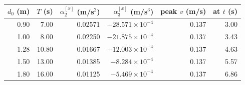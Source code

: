 \begin{tabular}{@{}rrrrrr@{}}
\toprule
$d_0$ (m) & $T$ (s) & $\alpha_2^{[x]}$ (m/s$^2$) & $\alpha_3^{[x]}$ (m/s$^3$) & peak $v$ (m/s) & at $t$ (s)\\
\midrule
0.90 & 7.00 & 0.02571 & $-28.571\times10^{-4}$ & 0.137 & 3.00\\
1.00 & 8.00 & 0.02250 & $-21.875\times10^{-4}$ & 0.137 & 3.43\\
1.28 & 10.80 & 0.01667 & $-12.003\times10^{-4}$ & 0.137 & 4.63\\
1.50 & 13.00 & 0.01385 & $-8.284\times10^{-4}$ & 0.137 & 5.57\\
1.80 & 16.00 & 0.01125 & $-5.469\times10^{-4}$ & 0.137 & 6.86\\
\bottomrule
\end{tabular}
